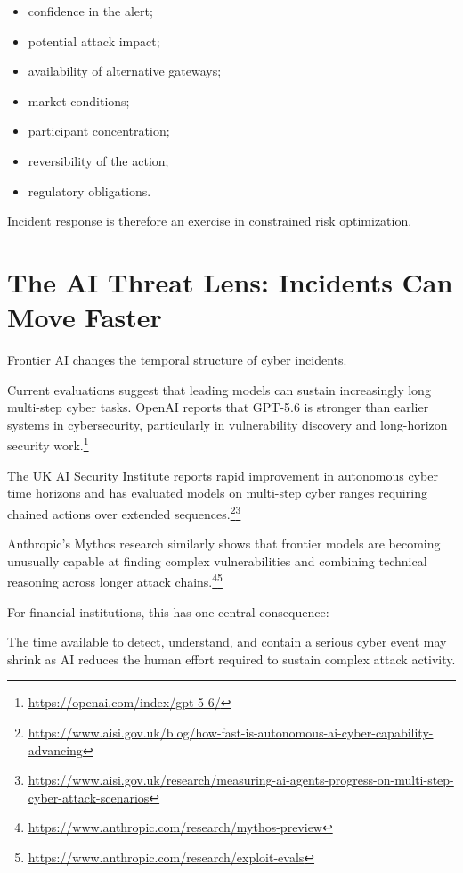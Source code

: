 \begin{itemize}
    \item confidence in the alert;
    \item potential attack impact;
    \item availability of alternative gateways;
    \item market conditions;
    \item participant concentration;
    \item reversibility of the action;
    \item regulatory obligations.
\end{itemize}

Incident response is therefore an exercise in constrained risk optimization.

\section{The AI Threat Lens: Incidents Can Move Faster}

Frontier AI changes the temporal structure of cyber incidents.

Current evaluations suggest that leading models can sustain increasingly long multi-step cyber tasks. OpenAI reports that GPT-5.6 is stronger than earlier systems in cybersecurity, particularly in vulnerability discovery and long-horizon security work.\footnote{\url{https://openai.com/index/gpt-5-6/}}

The UK AI Security Institute reports rapid improvement in autonomous cyber time horizons and has evaluated models on multi-step cyber ranges requiring chained actions over extended sequences.\footnote{\url{https://www.aisi.gov.uk/blog/how-fast-is-autonomous-ai-cyber-capability-advancing}}\footnote{\url{https://www.aisi.gov.uk/research/measuring-ai-agents-progress-on-multi-step-cyber-attack-scenarios}}

Anthropic's Mythos research similarly shows that frontier models are becoming unusually capable at finding complex vulnerabilities and combining technical reasoning across longer attack chains.\footnote{\url{https://www.anthropic.com/research/mythos-preview}}\footnote{\url{https://www.anthropic.com/research/exploit-evals}}

For financial institutions, this has one central consequence:

\begin{intuition}
The time available to detect, understand, and contain a serious cyber event may shrink as AI reduces the human effort required to sustain complex attack activity.
\end{intuition}


